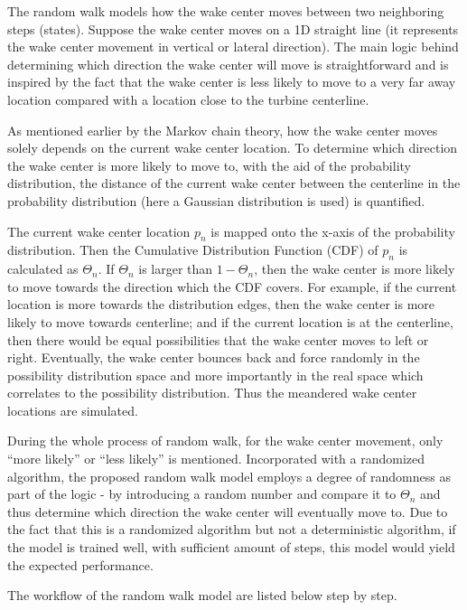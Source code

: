 \documentclass{umthesis}
\begin{document}
The random walk models how the wake center moves between two neighboring steps (states). Suppose the wake center moves on a 1D straight line (it represents the wake center movement in vertical or lateral direction). The main logic behind determining which direction the wake center will move is straightforward and is inspired by the fact that the wake center is less likely to move to a very far away location compared with a location close to the turbine centerline.

As mentioned earlier by the Markov chain theory, how the wake center moves solely depends on the current wake center location. To determine which direction the wake center is more likely to move to, with the aid of the probability distribution, the distance of the current wake center between the centerline in the probability distribution (here a Gaussian distribution is used) is quantified. 

The current wake center location $p_n$ is mapped onto the x-axis of the probability distribution. Then the Cumulative Distribution Function (CDF) of $p_n$ is calculated as $\Theta_n$. If $\Theta_n$ is larger than $1-\Theta_n$, then the wake center is more likely to move towards the direction which the CDF covers. For example, if the current location is more towards the distribution edges, then the wake center is more likely to move towards centerline; and if the current location is at the centerline, then there would be equal possibilities that the wake center moves to left or right. Eventually, the wake center bounces back and force randomly in the possibility distribution space and more importantly in the real space which correlates to the possibility distribution. Thus the meandered wake center locations are simulated.

During the whole process of random walk, for the wake center movement, only ``more likely'' or ``less likely'' is mentioned. Incorporated with a randomized algorithm, the proposed random walk model employs a degree of randomness as part of the logic - by introducing a random number and compare it to $\Theta_n$ and thus determine which direction the wake center will eventually move to. Due to the fact that this is a randomized algorithm but not a deterministic algorithm, if the model is trained well, with sufficient amount of steps, this model would yield the expected performance.

The workflow of the random walk model are listed below step by step.
\end{document}
